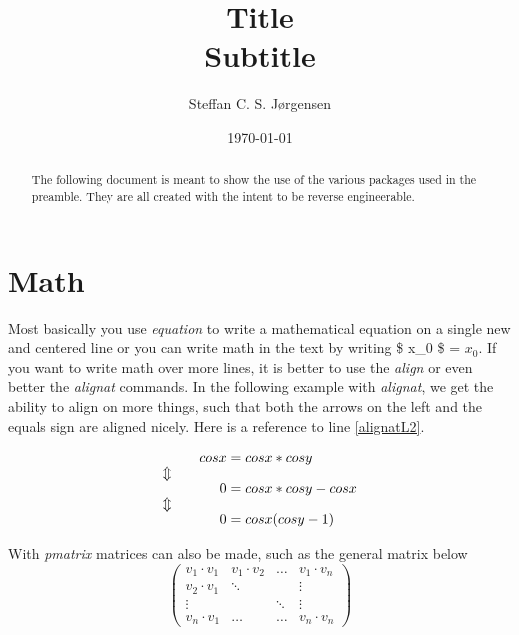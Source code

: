 \documentclass[a4, english]{article}
\begin{document}
    \title{\huge Title \\ \large Subtitle}
    
    \author{Steffan C. S. Jørgensen}
    
    \date{\today}
    
    \chead{}

\maketitle

\begin{abstract}
\noindent The following document is meant to show the use of the various packages used in the preamble. They are all created with the intent to be reverse engineerable.
\end{abstract}

\tableofcontents

\newpage
\section{Math} \label{sec:math}
Most basically you use \emph{equation} to write a mathematical equation on a single new and centered line or you can write math in the text by writing \$ x\_0 \$ = $x_0$. If you want to write math over more lines, it is better to use the \emph{align} or even better the \emph{alignat} commands. In the following example with \emph{alignat}, we get the ability to align on more things, such that both the arrows on the left and the equals sign are aligned nicely. Here is a reference to line \ref{alignatL2}.

\begin{alignat}{2}
&& cos x &= cos x * cos y \label{alignatL1}
\\ \ArrowBetweenLines
&& 0 &= cos x * cos y - cos x \label{alignatL2}
\\ \ArrowBetweenLines
&& 0 &= cos x (cos y - 1) \label{alignatL3}
\end{alignat}

With \emph{pmatrix} matrices can also be made, such as the general matrix below
\begin{equation*}
	\begin{pmatrix}
		v_1 \cdot v_1 & v_1 \cdot v_2 & \dots & v_1 \cdot v_n
\\		v_2 \cdot v_1 & \ddots & & \vdots
\\		\vdots & & \ddots & \vdots
\\		v_n \cdot v_1 & \dots & \dots & v_n \cdot v_n
	\end{pmatrix}
\end{equation*}
\end{document}
